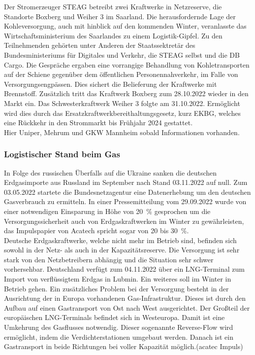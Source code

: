 		Der Stromerzeuger STEAG betreibt zwei Kraftwerke in Netzreserve, die Standorte Boxberg und Weiher 3 im Saarland. Die herausfordernde Lage der Kohleversorgung, auch mit hinblick auf den kommenden Winter, veranlasste das Wirtschaftsministerium des Saarlandes zu einem Logistik-Gipfel. Zu den Teilnehmenden gehörten unter Anderen der Staatssektretär des Bundesministeriums für Digitales und Verkehr, die STEAG selbst und die DB Cargo. Die Gespräche ergaben eine vorrangige Behandlung von Kohletransporten auf der Schiene gegenüber dem öffentlichen Personennahverkehr, im Falle von Versorgungsengpässen. Dies sichert die Belieferung der Kraftwerke mit Brennstoff. Zusätzlich tritt das Kraftwerk Boxberg zum 28.10.2022 wieder in den Markt ein. Das Schwesterkraftwerk Weiher 3 folgte am 31.10.2022. Ermöglicht wird dies durch das Ersatzkraftwerkbereithaltungsgesetz, kurz EKBG, welches eine Rückkehr in den Strommarkt bis Frühjahr 2024 gestattet.\\
		
		Hier Uniper, Mehrum und GKW Mannheim sobald Informationen vorhanden.
		
		\subsubsection{Logistischer Stand beim Gas}
		In Folge des russischen Überfalls auf die Ukraine sanken die deutschen Erdgasimporte aus Russland im September nach Stand 03.11.2022 auf null. Zum 03.05.2022 startete die Bundesnetzagentur eine Datenerhebung um den deutschen Gasverbrauch zu ermitteln. In einer Pressemitteilung vom 29.09.2022 wurde von einer notwendigen Einsparung in Höhe von \SI{20}{\percent} gesprochen um die Versorgungssicherheit auch von Erdgaskraftwerken im Winter zu gewährleisten, das Impulspapier von Acatech spricht sogar von 20 bis \SI{30}{\percent}.\\
		
		Deutsche Erdgaskraftwerke, welche nicht mehr im Betrieb sind, befinden sich sowohl in der Netz- als auch in der Kapazitätsreserve. Die Versorgung ist sehr stark von den Netzbetreibern abhängig und die Situation sehr schwer vorhersehbar. Deutschland verfügt zum 04.11.2022 über ein LNG-Terminal zum Import von verflüssigtem Erdgas in Lubmin. Ein weiteres soll im Winter in Betrieb gehen.
		Ein zusätzliches Problem bei der Versorgung besteht in der Ausrichtung der in Europa vorhandenen Gas-Infrastruktur. Dieses ist durch den Aufbau auf einen Gastransport von Ost nach West ausgerichtet. Der Großteil der europäischen LNG-Terminals befindet sich in Westeuropa. Damit ist eine Umkehrung des Gasflusses notwendig. Dieser sogenannte Reverse-Flow wird ermöglicht, indem die Verdichterstationen umgebaut werden. Danach ist ein Gastransport in beide Richtungen bei voller Kapazität möglich.(acatec Impuls)\\
		
